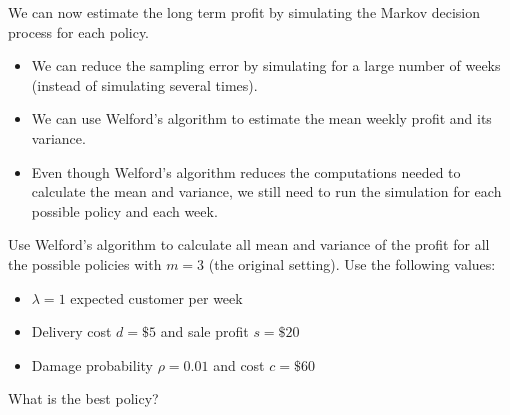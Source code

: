 \begin{slide}


We can now estimate the long term profit by simulating the Markov decision process for each policy.

\begin{itemize}
	\item We can reduce the sampling error by simulating for a large number of weeks (instead of simulating several times).
	\item We can use Welford's algorithm to estimate the mean weekly profit and its variance.
	\item Even though Welford's algorithm reduces the computations needed to calculate the mean and variance, we still need to run the simulation for each possible policy and each week.
\end{itemize}

\begin{parts}
\setcounter{partsitem}{4}
	\item Use Welford's algorithm to calculate all mean and variance of the profit for all the possible policies with $m=3$ (the original setting).
	Use the following values: 
	\begin{itemize}
		\item $\lambda=1$ expected customer per week
		\item Delivery cost $d=\$5$ and sale profit $s=\$20$
		\item Damage probability $\rho=0.01$ and cost $c=\$60$
	\end{itemize}
	
	What is the best policy?
\end{parts}	
	
\end{slide}


